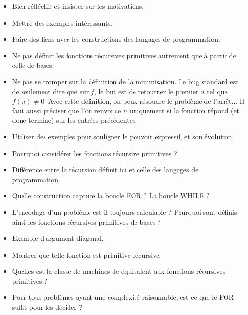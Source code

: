 \documentclass{agregfiche}
\begin{document}
\begin{itemize}
    \item Bien réfléchir et insister sur les motivations.
	\item Mettre des exemples intéressants.
    \item Faire des liens avec les constructions des langages de programmation.
	\item Ne pas définir les fonctions récursives primitives autrement que à partir de celle de bases.
    \item Ne pas se tromper sur la définition de la minimisation. Le bug standard est de seulement dire que sur $f$, le but est de retourner le premier $n$ tel que $f(n) \neq 0$. Avec cette définition, on peux résoudre le problème de l'arrêt... Il faut aussi préciser que l'on renvoi ce $n$ uniquement si la fonction répond (et donc termine) sur les entrées précédentes.
    \item Utiliser des exemples pour souligner le pouvoir expressif, et son évolution.
\end{itemize}

\secquestionsclassiques

\begin{itemize}
	\item Pourquoi considérer les fonctions récursive primitives ? %
	\item Différence entre la récursion définit ici et celle des langages de programmation.
    \item Quelle construction capture la boucle FOR ? La boucle WHILE ?
	\item L'encodage d'un problème est-il toujours calculable ? Pourquoi sont définis ainsi les fonctions récursives primitives de bases ?
	\item Exemple d'argument diagonal.
	\item Montrer que telle fonction est primitive récursive.
    \item Quelles est la classe de machines de  équivalent aux fonctions récursives primitives ? %
    \item Pour tous problèmes ayant une complexité raisonnable, est-ce que le FOR suffit pour les décider ?	
\end{itemize}
\end{document}
